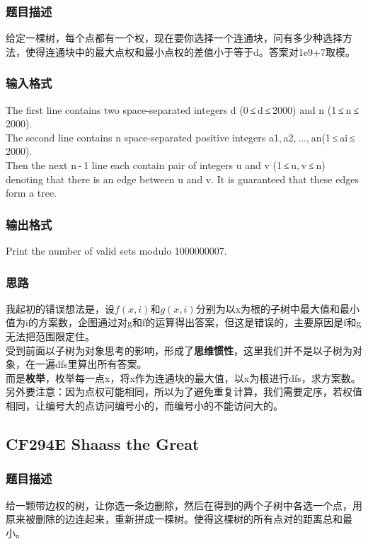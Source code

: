     \subsubsection{题目描述}
        给定一棵树，每个点都有一个权，现在要你选择一个连通块，问有多少种选择方法，使得连通块中的最大点权和最小点权的差值小于等于d。答案对1e9+7取模。
    \subsubsection{输入格式}
        The first line contains two space-separated integers d (0 ≤ d ≤ 2000) and n (1 ≤ n ≤ 2000).\\
        The second line contains n space-separated positive integers a1, a2, ..., an(1 ≤ ai ≤ 2000).\\
        Then the next n - 1 line each contain pair of integers u and v (1 ≤ u, v ≤ n) denoting that there is an edge between u and v. It is guaranteed that these edges form a tree.
    \subsubsection{输出格式}
        Print the number of valid sets modulo 1000000007.
    \subsubsection{思路}
        我起初的错误想法是，设$f(x,i)$和$g(x,i)$分别为以x为根的子树中最大值和最小值为i的方案数，企图通过对g和f的运算得出答案，但这是错误的，主要原因是f和g无法把范围限定住。\\
        受到前面以子树为对象思考的影响，形成了\textbf{思维惯性}，这里我们并不是以子树为对象，在一遍dfs里算出所有答案。\\
        而是\textbf{枚举}，枚举每一点x，将x作为连通块的最大值，以x为根进行dfs，求方案数。\\
        另外要注意：因为点权可能相同，所以为了避免重复计算，我们需要定序，若权值相同，让编号大的点访问编号小的，而编号小的不能访问大的。

\subsection{CF294E Shaass the Great}
    \subsubsection{题目描述}
        给一颗带边权的树，让你选一条边删除，然后在得到的两个子树中各选一个点，用原来被删除的边连起来，重新拼成一棵树。使得这棵树的所有点对的距离总和最小。\\

